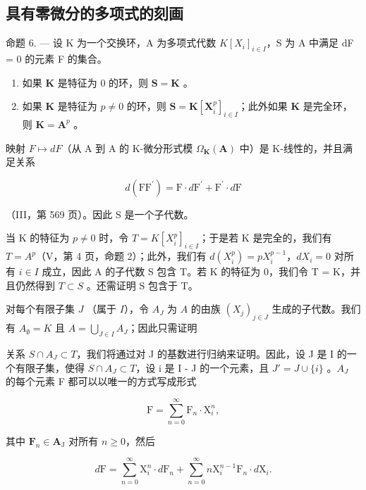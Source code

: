 \subsection{具有零微分的多项式的刻画}

命题 6. --- 设 K 为一个交换环，A 为多项式代数 \(K[X_{i}]_{i \in I}\)，S 为 A 中满足 dF = 0 的元素 F 的集合。

\begin{enumerate}
\def\labelenumi{\alph{enumi})}
\item
  如果 \(\mathbf{K}\) 是特征为 0 的环，则 \(\mathbf{S} = \mathbf{K}\) 。
\item
  如果 \(\mathbf{K}\) 是特征为 \(p \neq 0\) 的环，则 \(\mathbf{S} = \mathbf{K}[\mathbf{X}_i^p]_{i \in I}\)；此外如果 \(\mathbf{K}\) 是完全环，则 \(\mathbf{K} = \mathbf{A}^p\) 。
\end{enumerate}

映射 \(F \mapsto dF\)（从 A 到 A 的 K-微分形式模 \(\Omega_{\mathbf{K}}(\mathbf{A})\) 中）是 K-线性的，并且满足关系

\[
d \left(\mathrm{FF} ^ {\prime}\right) = \mathrm{F} \cdot d \mathrm{F} ^ {\prime} + \mathrm{F} ^ {\prime} \cdot d \mathrm{F}
\]

（III，第 569 页）。因此 S 是一个子代数。

当 K 的特征为 \(p \neq 0\) 时，令 \(T = K[X_{i}^{p}]_{i \in I}\)；于是若 K 是完全的，我们有 \(T = A^{p}\)（V，第 4 页，命题 2）；此外，我们有 \(d(X_{i}^{p}) = pX_{i}^{p-1}\)，\(dX_{i} = 0\) 对所有 \(i \in I\) 成立，因此 A 的子代数 S 包含 T。若 K 的特征为 0，我们令 T = K，并且仍然得到 \(T \subset S\) 。还需证明 S 包含于 T。

对每个有限子集 \(J\) （属于 \(I\)），令 \(A_{J}\) 为 \(A\) 的由族 \((X_{j})_{j\in J}\) 生成的子代数。我们有 \(A_{\emptyset} = K\) 且 \(A = \bigcup_{J\in I}A_{J}\)；因此只需证明

关系 \(S \cap A_{J} \subset T\)，我们将通过对 J 的基数进行归纳来证明。因此，设 J 是 I 的一个有限子集，使得 \(S \cap A_{J} \subset T\)，设 i 是 I - J 的一个元素，且 \(J' = J \cup \{i\}\) 。\(A_{J}\) 的每个元素 F 都可以以唯一的方式写成形式

\[
\mathrm{F} = \sum_ {n = 0} ^ {\infty} \mathrm{F} _ {n} \cdot \mathrm{X} _ {i} ^ {n},\tag{5}
\]

其中 \(\mathbf{F}_n\in \mathbf{A}_{\mathrm{J}}\) 对所有 \(n\geqslant 0\)，然后

\[
d \mathrm{F} = \sum_ {n = 0} ^ {\infty} \mathrm{X} _ {i} ^ {n} \cdot d \mathrm{F} _ {n} + \sum_ {n = 0} ^ {\infty} n \mathrm{X} _ {i} ^ {n - 1} \mathrm{F} _ {n} \cdot d \mathrm{X} _ {i}.\tag{6}
\]


